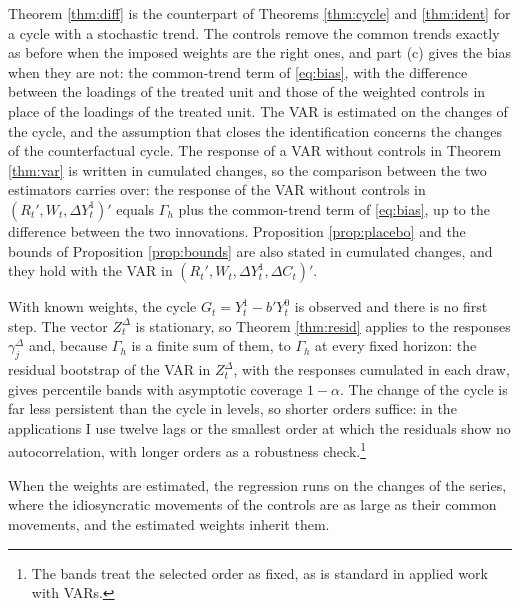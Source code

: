 \documentclass[12pt,a4paper]{article}
\theoremstyle{definition}
\theoremstyle{definition}\newtheorem{example}{Example}
\theoremstyle{definition}\newtheorem{definition}{Definition}
\begin{document}
Theorem \ref{thm:diff} is the counterpart of Theorems \ref{thm:cycle} and \ref{thm:ident} for a cycle with a stochastic trend. The controls remove the common trends exactly as before when the imposed weights are the right ones, and part (c) gives the bias when they are not: the common-trend term of \eqref{eq:bias}, with the difference between the loadings of the treated unit and those of the weighted controls in place of the loadings of the treated unit. The VAR is estimated on the changes of the cycle, and the assumption that closes the identification concerns the changes of the counterfactual cycle. The response of a VAR without controls in Theorem \ref{thm:var} is written in cumulated changes, so the comparison between the two estimators carries over: the response of the VAR without controls in $(R_t',W_t,\Delta Y^1_t)'$ equals $\Gamma_h$ plus the common-trend term of \eqref{eq:bias}, up to the difference between the two innovations. Proposition \ref{prop:placebo} and the bounds of Proposition \ref{prop:bounds} are also stated in cumulated changes, and they hold with the VAR in $(R_t',W_t,\Delta Y^1_t,\Delta C_t)'$.

With known weights, the cycle $G_t=Y^1_t-b'Y^0_t$ is observed and there is no first step. The vector $Z^\Delta_t$ is stationary, so Theorem \ref{thm:resid} applies to the responses $\gamma^\Delta_j$ and, because $\Gamma_h$ is a finite sum of them, to $\Gamma_h$ at every fixed horizon: the residual bootstrap of the VAR in $Z^\Delta_t$, with the responses cumulated in each draw, gives percentile bands with asymptotic coverage $1-\alpha$. The change of the cycle is far less persistent than the cycle in levels, so shorter orders suffice: in the applications I use twelve lags or the smallest order at which the residuals show no autocorrelation, with longer orders as a robustness check.\footnote{The bands treat the selected order as fixed, as is standard in applied work with VARs.}

When the weights are estimated, the regression runs on the changes of the series, where the idiosyncratic movements of the controls are as large as their common movements, and the estimated weights inherit them.
\end{document}
